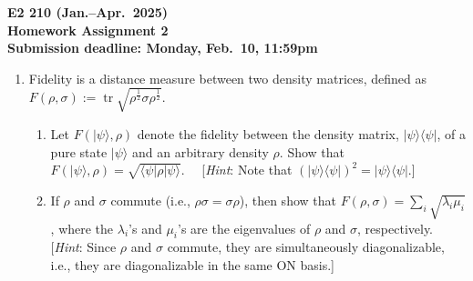 \documentclass[11pt,a4paper]{article}
\DeclareMathOperator{\tr}{tr}
\begin{document}
\begin{center}
{\Large \bf E2 210 (Jan.--Apr.\ 2025)} \\[6pt]

{\large\bf Homework Assignment 2} \\[6pt]

{\bf Submission deadline: Monday, Feb.\ 10, 11:59pm}
\end{center}

\vspace{2ex}

\noindent
\begin{enumerate}
\item Fidelity is a distance measure between two density matrices, defined as $F(\rho,\sigma) := \tr \sqrt{\rho^{\frac12} \sigma \rho^{\frac12}}$. 
\begin{enumerate}
\item Let $F(|\psi\rangle,\rho)$ denote the fidelity between the density matrix, $|\psi\rangle\langle\psi|$, of a pure state $|\psi\rangle$ and an arbitrary density $\rho$. Show that $F(|\psi\rangle,\rho) = \sqrt{\langle\psi|\rho|\psi\rangle}$. \ \ 
{[\emph{Hint\/}: Note that ${(|\psi\rangle\langle\psi|)}^2 = |\psi\rangle\langle\psi|$.]}
\item If $\rho$ and $\sigma$ commute (i.e., $\rho\sigma = \sigma\rho$), then show that $F(\rho,\sigma) = \sum\limits_i\sqrt{\lambda_i \mu_i}$, where the $\lambda_i$'s and $\mu_i$'s are the eigenvalues of $\rho$ and $\sigma$, respectively. \\[4pt]
{[\emph{Hint}\/: Since $\rho$ and $\sigma$ commute, they are simultaneously diagonalizable, i.e., they are diagonalizable in the same ON basis.]}
\end{enumerate}


\end{enumerate}
\end{document}
